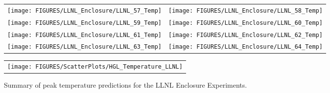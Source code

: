 \begin{figure}[p]
\begin{tabular*}{\textwidth}{l@{\extracolsep{\fill}}r}
\texttt{[image: FIGURES/LLNL\_Enclosure/LLNL\_57\_Temp]} &
\texttt{[image: FIGURES/LLNL\_Enclosure/LLNL\_58\_Temp]} \\
\texttt{[image: FIGURES/LLNL\_Enclosure/LLNL\_59\_Temp]} &
\texttt{[image: FIGURES/LLNL\_Enclosure/LLNL\_60\_Temp]} \\
\texttt{[image: FIGURES/LLNL\_Enclosure/LLNL\_61\_Temp]} &
\texttt{[image: FIGURES/LLNL\_Enclosure/LLNL\_62\_Temp]} \\
\texttt{[image: FIGURES/LLNL\_Enclosure/LLNL\_63\_Temp]} &
\texttt{[image: FIGURES/LLNL\_Enclosure/LLNL\_64\_Temp]}
\end{tabular*}
\label{LLNL_Enclosure_Temp_8}
\end{figure}

\begin{figure}[p]
\begin{center}
\begin{tabular}{l}
\texttt{[image: FIGURES/ScatterPlots/HGL\_Temperature\_LLNL]}
\end{tabular}
\caption{Summary of peak temperature predictions for the LLNL Enclosure Experiments.}
\end{center}
\end{figure}



